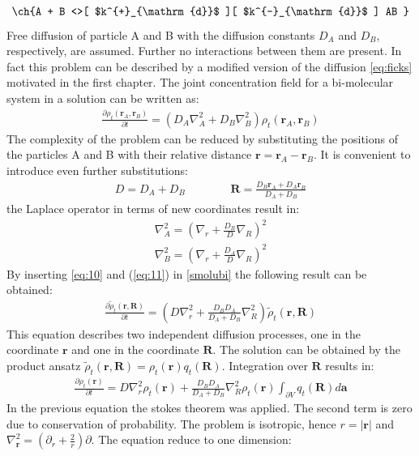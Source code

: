 \documentclass[
  a4paper,BCOR10mm,oneside,
  headsepline,footsepline,%
  fleqn,openbib
]{scrbook}
\begin{document}
\begin{align*}
\text{\ch{A + B <>[ $k^{+}_{\mathrm{d}}$ ][ $k^{-}_{\mathrm{d}}$ ] AB }}
\end{align*}
Free diffusion of particle A and B with the diffusion constants $D_A$ and $D_B$, respectively, are assumed. Further no interactions between them are present. In fact this problem can be described by a modified version of the diffusion \cref{eq:ficks} motivated in the first chapter.
The joint concentration field for a bi-molecular system in a solution can be written as:
\begin{align}
 \frac{\partial \rho_t(\bm{r}_A,\bm{r}_B)}{\partial t}=(D_A \nabla^{2}_{A}+D_B \nabla^{2}_{B}) \rho_t(\bm{r}_A,\bm{r}_B) \label{smolubi}
\end{align}
The complexity of the problem can be reduced by substituting the positions of the particles A and B with their relative distance $\bm{r}=\bm{r}_A-\bm{r}_B$. It is convenient to introduce even further substitutions:
\begin{align}
 D= D_A+D_B \qquad \qquad \bm{R}=\frac{D_B \bm{r}_A+ D_A \bm{r}_B}{D_A+D_B}
\end{align}
the Laplace operator in terms of new coordinates result in:
\begin{align}
\nabla^{2}_{A} = \left( \nabla_r+\frac{D_B}{D} \nabla_R \right)^2 \label{eq:10}\\
\nabla^{2}_{B} = \left( \nabla_r+\frac{D_A}{D} \nabla_R \right)^2 \label{eq:11}
\end{align}
By inserting \cref{eq:10}  and (\ref{eq:11}) in \cref{smolubi} the following result can be obtained:
\begin{align}
 \frac{\partial \tilde{\rho}_t(\bm{r},\bm{R})}{\partial t}=\left(D \nabla^{2}_{r}+\frac{D_B D_A}{D_A+D_B}\nabla^{2}_{R}\right) \tilde{\rho}_t(\bm{r},\bm{R})
\end{align}
This equation describes two independent diffusion processes, one in the coordinate $\bm{r}$ and one in the coordinate $\bm{R}$. The solution can be obtained by the product ansatz $\tilde{\rho}_t(\bm{r},\bm{R})=\rho_t(\bm{r})q_t(\bm{R})$. Integration over $\bm{R}$ results in:
\begin{align}
\frac{\partial \rho_t(\bm{r})}{\partial t}=D \nabla^{2}_{r} \rho_t(\bm{r}) +\frac{D_B D_A}{D_A+D_B} \nabla^{2}_{R} \rho_t(\bm{r}) \int_{\partial V} q_t(\bm{R}) d \bm{a}
\end{align}
In the previous equation the stokes theorem was applied. The second term is zero due to conservation of probability. The problem is isotropic, hence $r=|\bm{r}|$ and $\nabla^{2}_{\bm{r}}=\left(\partial_r+\frac{2}{r}\right)\partial$. The equation reduce to one dimension:
\end{document}
